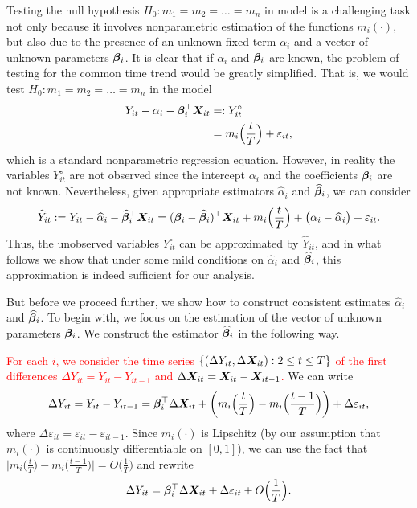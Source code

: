 \documentclass[a4paper,12pt]{article}
\makeatletter
\renewcommand{\eqref}[1]{\tagform@{\ref{#1}}}
\makeatother
\begin{document}
Testing the null hypothesis $H_0: m_1 = m_2 = \ldots = m_n$ in model \eqref{eq:model_full} is a challenging task not only because it involves nonparametric estimation of the functions $m_i(\cdot)$, but also due to the presence of an unknown fixed term $\alpha_i$ and a vector of unknown parameters $\bm{\beta}_i$. It is clear that if $\alpha_i$ and $\bm{\beta}_i$ are known, the problem of testing for the common time trend would be greatly simplified. That is, we would test $H_0: m_1 = m_2 = \ldots = m_n$ in the model
\begin{align*}
Y_{it} - \alpha_i - \bm{\beta}_i^\top \boldsymbol{X}_{it} & =: Y_{it}^\circ\\
					& = m_i \Big( \frac{t}{T} \Big) + \varepsilon_{it}, 
\end{align*}
which is a standard nonparametric regression equation. However, in reality the variables $Y_{it}^\circ$ are not observed since the intercept $\alpha_i$ and the coefficients $\bm{\beta}_i$ are not known. Nevertheless, given appropriate estimators $\widehat{\alpha}_i$ and $\widehat{\bm{\beta}}_i$, we can consider
\begin{align*}
\widehat{Y}_{it} := Y_{it} -\widehat{\alpha}_i - \widehat{\bm{\beta}}_i^\top \boldsymbol{X}_{it} =(\bm{\beta}_i - \widehat{\bm{\beta}}_i)^\top \boldsymbol{X}_{it} + m_i \Big( \frac{t}{T} \Big) + \big( \alpha_i - \widehat{\alpha}_i \big) + \varepsilon_{it}. 
\end{align*}
Thus, the unobserved variables $Y_{it}^\circ$ can be approximated by $\widehat{Y}_{it}$, and in what follows we show that under some mild conditions on $\widehat{\alpha}_i$ and $\widehat{\bm{\beta}}_i$, this approximation is indeed sufficient for our analysis. 

But before we proceed further, we show how to construct consistent estimates $\widehat{\alpha}_i$ and $\widehat{\bm{\beta}}_i$. To begin with, we focus on the estimation of the vector of unknown parameters $\bm{\beta}_i$. We construct the estimator  $\widehat{\bm{\beta}}_i$ in the following way.

\textcolor{red}{For each $i$, we consider the time series $\{(\Delta Y_{it}, \Delta \boldsymbol{X}_{it}): 2 \leq t \leq T\}$ of the first differences $\Delta Y_{it} = Y_{it} - Y_{i t-1}$ and $\Delta  \boldsymbol{X}_{it} =  \boldsymbol{X}_{it} -  \boldsymbol{X}_{it-1}$.} We can write
\begin{align*}
	\Delta Y_{it} = Y_{it} - Y_{i t-1} =\bm{\beta}_i^\top \Delta \boldsymbol{X}_{it} + \bigg(m_i \Big( \frac{t}{T} \Big) - m_i \Big(\frac{t-1}{T}\Big)\bigg) + \Delta \varepsilon_{it},
\end{align*}
where $ \Delta \varepsilon_{it} = \varepsilon_{it} - \varepsilon_{i t-1}$. Since $m_i(\cdot)$ is Lipschitz (by our assumption that $m_i(\cdot)$ is continuously differentiable on $[0, 1]$), we can use the fact that $ \big|m_i \big( \frac{t}{T} \big) - m_i \big(\frac{t-1}{T}\big) \big| = O\big(\frac{1}{T}\big)$ and rewrite 
\begin{align}\label{model_with_regs}
	\Delta Y_{it} = \bm{\beta}_i^\top \Delta \boldsymbol{X}_{it} + \Delta \varepsilon_{it} + O\Big(\frac{1}{T}\Big).
\end{align}
\end{document}
